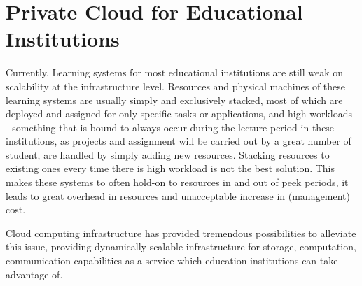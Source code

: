 \section{Private Cloud for Educational Institutions}\label{section:private_cloud}
Currently, Learning systems for most educational institutions are still weak on scalability at the infrastructure level. Resources and physical machines of these learning systems are usually simply and exclusively stacked, most of which are deployed and assigned for only specific tasks or applications, and high workloads - something that is bound to always occur during the lecture period in these institutions, as projects and assignment will be carried out by a great number of student, are handled by simply adding new resources. Stacking resources to existing ones every time there is high workload is not the best solution. This makes these systems to often hold-on to resources in and out of peek periods, it leads to great overhead in resources and unacceptable increase in (management) cost.

Cloud computing infrastructure has provided tremendous possibilities to alleviate this issue, providing dynamically scalable infrastructure for storage, computation, communication capabilities as a service which education institutions can take advantage of.

